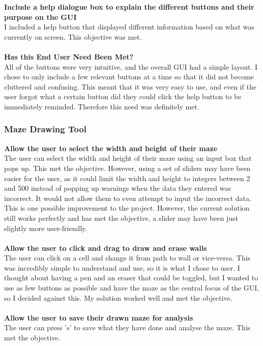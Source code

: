 \documentclass[titlepage]{article}
\begin{document}
\textbf{Include a help dialogue box to explain the different buttons and their purpose on the GUI}\\
I included a help button that displayed different information based on what was currently on screen. This objective was met.\\\\
\textbf{Has this End User Need Been Met?}\\
All of the buttons were very intuitive, and the overall GUI had a simple layout. I chose to only include a few relevant buttons at a time so that it did not become cluttered and confusing. This meant that it was very easy to use, and even if the user forgot what a certain button did they could click the help button to be immediately reminded. Therefore this need was definitely met.

\subsubsection{Maze Drawing Tool}
\textbf{Allow the user to select the width and height of their maze}\\
The user can select the width and height of their maze using an input box that pops up. This met the objective. However, using a set of sliders may have been easier for the user, as it could limit the width and height to integers between 2 and 500 instead of popping up warnings when the data they entered was incorrect. It would not allow them to even attempt to input the incorrect data. This is one possible improvement to the project. However, the current solution still works perfectly and has met the objective, a slider may have been just slightly more user-friendly.\\\\
\textbf{Allow the user to click and drag to draw and erase walls}\\
The user can click on a cell and change it from path to wall or vice-versa. This was incredibly simple to understand and use, so it is what I chose to user. I thought about having a pen and an eraser that could be toggled, but I wanted to use as few buttons as possible and have the maze as the central focus of the GUI, so I decided against this. My solution worked well and met the objective.\\\\
\textbf{Allow the user to save their drawn maze for analysis}\\
The user can press 's' to save what they have done and analyse the maze. This met the objective.\\\\
\end{document}
